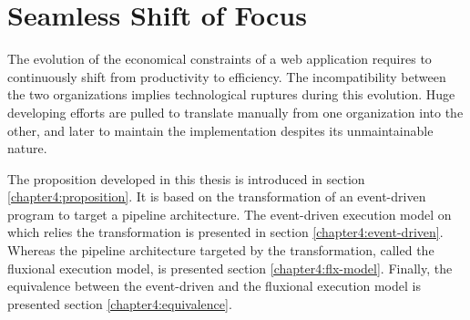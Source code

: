 \chapter{Seamless Shift of Focus} \label{chapter4}
\minitoc
\eject

The evolution of the economical constraints of a web application requires to continuously shift from productivity to efficiency.
The incompatibility between the two organizations implies technological ruptures during this evolution.
Huge developing efforts are pulled to translate manually from one organization into the other, and later to maintain the implementation despites its unmaintainable nature.

The proposition developed in this thesis is introduced in section \ref{chapter4:proposition}.
It is based on the transformation of an event-driven program to target a pipeline architecture.
The event-driven execution model on which relies the transformation is presented in section \ref{chapter4:event-driven}.
Whereas the pipeline architecture targeted by the transformation, called the fluxional execution model, is presented section \ref{chapter4:flx-model}.
Finally, the equivalence between the event-driven and the fluxional execution model is presented section \ref{chapter4:equivalence}.





